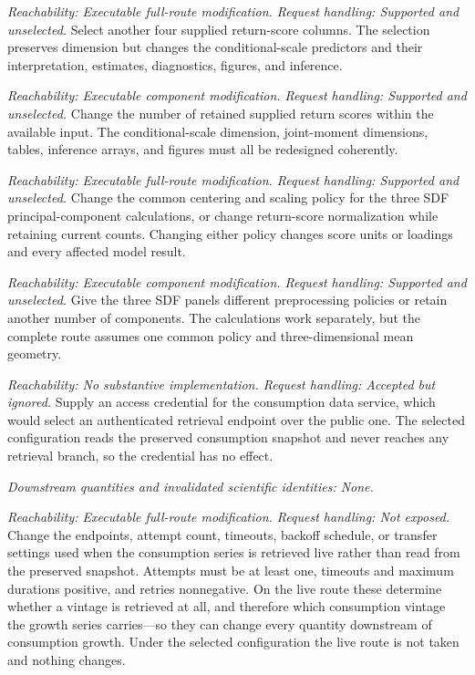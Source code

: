 \documentclass[11pt]{article}
\begin{document}
\begin{description}[style=nextline]
\item[Return-score column selection.]
\emph{Reachability: Executable full-route modification. Request handling: Supported and unselected.}
Select another four supplied return-score columns. The selection preserves dimension but changes
the conditional-scale predictors and their interpretation, estimates, diagnostics, figures, and
inference.

\item[Number of return scores.]
\emph{Reachability: Executable component modification. Request handling: Supported and unselected.}
Change the number of retained supplied return scores within the available input. The conditional-scale
dimension, joint-moment dimensions, tables, inference arrays, and figures must all be
redesigned coherently.

\item[Shared principal-component preprocessing.]
\emph{Reachability: Executable full-route modification. Request handling: Supported and unselected.}
Change the common centering and scaling policy for the three SDF principal-component calculations,
or change return-score normalization while retaining current counts. Changing either policy changes score units or
loadings and every affected model result.

\item[Unequal SDF preprocessing or component count.]
\emph{Reachability: Executable component modification. Request handling: Supported and unselected.}
Give the three SDF panels different preprocessing policies or retain another number of components.
The calculations work separately, but the complete route assumes one common policy and
three-dimensional mean geometry.

\item[Live consumption retrieval credential.]
\emph{Reachability: No substantive implementation. Request handling: Accepted but ignored.}
Supply an access credential for the consumption data service, which would select an authenticated
retrieval endpoint over the public one. The selected configuration reads the preserved consumption
snapshot and never reaches any retrieval branch, so the credential has no effect.

\emph{Downstream quantities and invalidated scientific identities: None.}

\item[Live consumption retrieval policy.]
\emph{Reachability: Executable full-route modification. Request handling: Not exposed.}
Change the endpoints, attempt count, timeouts, backoff schedule, or transfer settings used when the
consumption series is retrieved live rather than read from the preserved snapshot. Attempts must be
at least one, timeouts and maximum durations positive, and retries nonnegative. On the live route
these determine whether a vintage is retrieved at all, and therefore which consumption vintage the
growth series carries---so they can change every quantity downstream of consumption growth. Under
the selected configuration the live route is not taken and nothing changes.
\end{description}
\end{document}
